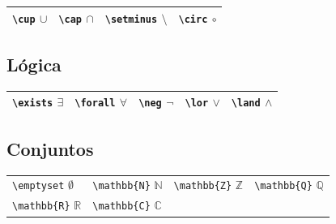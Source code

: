 \documentclass[
  a4paper,
]{scrreport}
\begin{document}
\begin{longtable}[]{@{}
  >{\raggedright\arraybackslash}p{}
  >{\raggedright\arraybackslash}p{}
  >{\raggedright\arraybackslash}p{}
  >{\raggedright\arraybackslash}p{}@{}}
\toprule()
\endhead
\texttt{\textbackslash{}cup} \(\cup\) & \texttt{\textbackslash{}cap}
\(\cap\) & \texttt{\textbackslash{}setminus} \(\setminus\) &
\texttt{\textbackslash{}circ} \(\circ\) \\
\bottomrule()
\end{longtable}

\hypertarget{luxf3gica}{%
\subsection{Lógica}\label{luxf3gica}}

\begin{longtable}[]{@{}
  >{\raggedright\arraybackslash}p{}
  >{\raggedright\arraybackslash}p{}
  >{\raggedright\arraybackslash}p{}
  >{\raggedright\arraybackslash}p{}
  >{\raggedright\arraybackslash}p{}@{}}
\toprule()
\endhead
\texttt{\textbackslash{}exists} \(\exists\) &
\texttt{\textbackslash{}forall} \(\forall\) &
\texttt{\textbackslash{}neg} \(\neg\) & \texttt{\textbackslash{}lor}
\(\lor\) & \texttt{\textbackslash{}land} \(\land\) \\
\bottomrule()
\end{longtable}

\hypertarget{conjuntos}{%
\subsection{Conjuntos}\label{conjuntos}}

\begin{longtable}[]{@{}
  >{\raggedright\arraybackslash}p{}
  >{\raggedright\arraybackslash}p{}
  >{\raggedright\arraybackslash}p{}
  >{\raggedright\arraybackslash}p{}@{}}
\toprule()
\endhead
\texttt{\textbackslash{}emptyset} \(\emptyset\) &
\texttt{\textbackslash{}mathbb\{N\}} \(\mathbb{N}\) &
\texttt{\textbackslash{}mathbb\{Z\}} \(\mathbb{Z}\) &
\texttt{\textbackslash{}mathbb\{Q\}} \(\mathbb{Q}\) \\
\texttt{\textbackslash{}mathbb\{R\}} \(\mathbb{R}\) &
\texttt{\textbackslash{}mathbb\{C\}} \(\mathbb{C}\) & & \\
\bottomrule()
\end{longtable}
\end{document}

